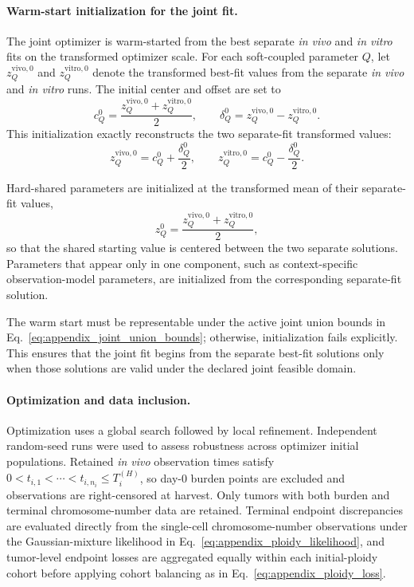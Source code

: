 \documentclass[11pt]{article}
\begin{document}
\paragraph{Warm-start initialization for the joint fit.}

The joint optimizer is warm-started from the best separate \textit{in vivo} and \textit{in vitro} fits on the transformed optimizer scale. For each soft-coupled parameter $Q$, let $z_Q^{\mathrm{vivo},0}$ and $z_Q^{\mathrm{vitro},0}$ denote the transformed best-fit values from the separate \textit{in vivo} and \textit{in vitro} runs. The initial center and offset are set to
\begin{equation}
c_Q^{0} = \frac{z_Q^{\mathrm{vivo},0} + z_Q^{\mathrm{vitro},0}}{2}, \qquad \delta_Q^{0} = z_Q^{\mathrm{vivo},0} - z_Q^{\mathrm{vitro},0}.
\label{eq:appendix_joint_warm_start_soft}
\end{equation}
This initialization exactly reconstructs the two separate-fit transformed values:
\[
z_Q^{\mathrm{vivo},0} = c_Q^0+\frac{\delta_Q^0}{2}, \qquad z_Q^{\mathrm{vitro},0} = c_Q^0-\frac{\delta_Q^0}{2}.
\]

Hard-shared parameters are initialized at the transformed mean of their separate-fit values,
\begin{equation}
z_Q^{0} = \frac{z_Q^{\mathrm{vivo},0} + z_Q^{\mathrm{vitro},0}}{2},
\label{eq:appendix_joint_warm_start_shared}
\end{equation}
so that the shared starting value is centered between the two separate solutions. Parameters that appear only in one component, such as context-specific observation-model parameters, are initialized from the corresponding separate-fit solution.

The warm start must be representable under the active joint union bounds in Eq.~\eqref{eq:appendix_joint_union_bounds}; otherwise, initialization fails explicitly. This ensures that the joint fit begins from the separate best-fit solutions only when those solutions are valid under the declared joint feasible domain.


\paragraph{Optimization and data inclusion.}

Optimization uses a global search followed by local refinement. Independent random-seed runs were used to assess robustness across optimizer initial populations. Retained \textit{in vivo} observation times satisfy $0<t_{i,1}<\cdots<t_{i,n_i}\le T_i^{(H)}$, so day-0 burden points are excluded and observations are right-censored at harvest. Only tumors with both burden and terminal chromosome-number data are retained. Terminal endpoint discrepancies are evaluated directly from the single-cell chromosome-number observations under the Gaussian-mixture likelihood in Eq.~\eqref{eq:appendix_ploidy_likelihood}, and tumor-level endpoint losses are aggregated equally within each initial-ploidy cohort before applying cohort balancing as in Eq.~\eqref{eq:appendix_ploidy_loss}.
\end{document}
